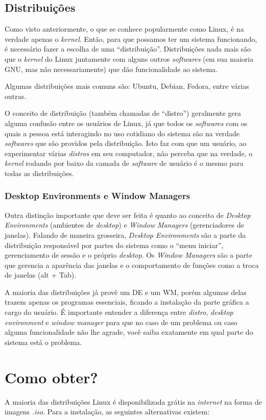 \documentclass{handout_utfpr}
\begin{document}
\subsection{Distribuições}\label{distro}
Como visto anteriormente, o que se conhece popularmente como Linux, é na verdade apenas o \textit{kernel}. Então, para que possamos ter um sistema funcionando, é necessário fazer a escolha de uma ``distribuição''. Distribuições nada mais são que o \textit{kernel} do Linux juntamente com alguns outros \textit{softwares} (em sua maioria GNU, mas não necessariamente) que dão funcionalidade ao sistema.

Algumas distribuições mais comuns são: Ubuntu, Debian, Fedora, entre várias outras.

O conceito de distribuição (também chamadas de ``distro'') geralmente gera alguma confusão entre os usuários de Linux, já que todos os \textit{softwares} com os quais a pessoa está interagindo no uso cotidiano do sistema são na verdade \textit{softwares} que são providos pela distribuição. Isto faz com que um usuário, ao experimentar várias \textit{distros} em seu computador, não perceba que na verdade, o \textit{kernel} rodando por baixo da camada de \textit{software} de usuário é o mesmo para todas as distribuições.

\subsubsection{Desktop Environments e Window Managers}
Outra distinção importante que deve ser feita é quanto ao conceito de \textit{Desktop Environments} (ambientes de \textit{desktop}) e \textit{Window Managers} (gerenciadores de janelas). Falando de maneira grosseira, \textit{Desktop Environments} são a parte da distribuição responsável por partes do sistema como o ``menu iniciar'', gerenciamento de sessão e o próprio \textit{desktop}. Os \textit{Window Managers} são a parte que gerencia a aparência das janelas e o comportamento de funções como a troca de janelas (alt + Tab).

A maioria das distribuições já provê um DE e um WM, porém algumas delas trazem apenas os programas essenciais, ficando a instalação da parte gráfica a cargo do usuário. É importante entender a diferença entre \textit{distro}, \textit{desktop environment} e \textit{window manager} para que no caso de um problema ou caso alguma funcionalidade não lhe agrade, você saiba exatamente em qual parte do sistema está o problema.

\section{Como obter?}
A maioria das distribuições Linux é disponibilizada grátis na \textit{internet} na forma de imagens \textit{.iso}. Para a instalação, as seguintes alternativas existem:
\end{document}
